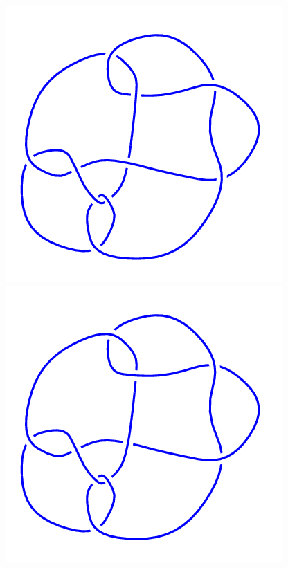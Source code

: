 \begin{figure}[H]
\begin{minipage}[b]{.18\linewidth}
	\end{minipage}
	\begin{minipage}[b]{.18\linewidth}
		\centering
		\includegraphics[width=\linewidth]{../data/10_134.png}
	\end{minipage}
	\begin{minipage}[b]{.18\linewidth}
		\centering
		\includegraphics[width=\linewidth]{../data/10_135.png}

\end{minipage}
\end{figure}
